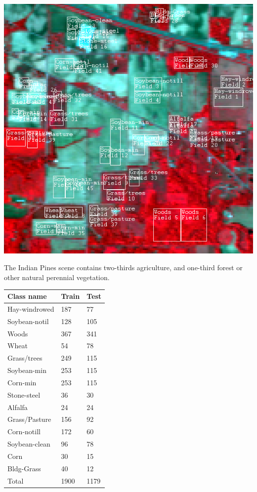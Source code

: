 \documentclass[landscape,a0paper,fontscale=0.285]{baposter} %
\begin{document}
\begin{poster}
{\begin{multicols}{2}
	
\begin{center}
	\includegraphics[width=.98\linewidth]{Dataset.png}
\end{center}
The Indian Pines scene contains
two-thirds agriculture, and one-third forest or other natural perennial vegetation.
\begin{center}
	\begin{tabular}{|l|l|l|}
		\hline
		Class name & Train & Test\\ \hline
		Hay-windrowed & 187 & 77\\ \hline
		Soybean-notil & 128 & 105\\ \hline
		Woods & 367 & 341\\ \hline
		Wheat & 54 & 78\\ \hline
		Grass/trees & 249 & 115\\ \hline
		Soybean-min & 253 & 115\\ \hline
		Corn-min & 253 & 115\\ \hline
		Stone-steel & 36 & 30\\ \hline
		Alfalfa & 24 & 24\\ \hline
		Grass/Pasture & 156 & 92\\ \hline
		Corn-notill & 172 & 60\\ \hline
		Soybean-clean & 96 & 78\\ \hline
		Corn & 30 & 15\\ \hline
		Bldg-Grass & 40 & 12\\ \hline
		Total & 1900 & 1179\\ \hline
	\end{tabular}
\end{center}



\end{multicols}}
\end{poster}
\end{document}
